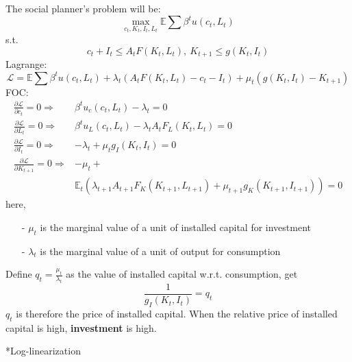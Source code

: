 \documentclass[10pt,landscape,a4paper]{article}
\makeatletter
\renewcommand{\section}{\@startsection{section}{1}{0mm}{1ex}{.2ex}{\normalsize\bfseries}}
\makeatother
\begin{document}
\begin{multicols*}{3}
The social planner's problem will be:
$$
\max_{c_t,K_t,I_t,L_t} \mathbb{E}\sum\beta^t u(c_t,L_t)
$$
s.t.
$$
c_t+I_t\leq A_tF(K_t,L_t),\ K_{t+1}\leq g(K_t,I_t)
$$
Lagrange:
$$
\mathcal{L}=\mathbb{E}\sum\beta^t u(c_t,L_t)+\lambda_t\left(A_tF(K_t,L_t)-c_t-I_t\right)+\mu_t\left(g(K_t,I_t)-K_{t+1}\right)
$$
FOC:
\begin{align*}
    \frac{\partial\mathcal{L}}{\partial c_t}=0 \Rightarrow& \beta^t u_c(c_t,L_t)-\lambda_t=0\\
    \frac{\partial\mathcal{L}}{\partial L_t}=0 \Rightarrow & \beta^t u_L(c_t,L_t)-\lambda_t A_tF_L(K_t,L_t)=0\\
    \frac{\partial\mathcal{L}}{\partial I_t}=0 \Rightarrow & -\lambda_t+\mu_tg_I(K_t,I_t)=0\\
    \frac{\partial\mathcal{L}}{ \partial K_{t+1}}=0\Rightarrow & -\mu_t +\\
    &\mathbb{E}_t\left(\lambda_{t+1}A_{t+1}F_K(K_{t+1},L_{t+1})+\mu_{t+1}g_K(K_{t+1},I_{t+1})\right)=0
\end{align*}
here,
\begin{itemize}
    \item[-] $\mu_t$ is the marginal value of a unit of installed capital for investment
    \item[-] $\lambda_t$ is the marginal value of a unit of output for consumption
\end{itemize}
Define $q_t=\frac{\mu_t}{\lambda_t}$ as the value of installed capital w.r.t. consumption, get 
$$
\frac{1}{g_I(K_t,I_t)}=q_t
$$
$q_t$ is therefore the price of installed capital. When the relative price of installed capital is high, \textbf{investment} is high.

\section*{Log-linearization}


\end{multicols*}
\end{document}
